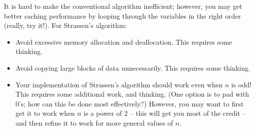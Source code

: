 \documentclass[11pt]{article}
\begin{document}

It is hard to make the conventional algorithm inefficient; however,
you may get better caching performance by looping through the
variables in the right order (really, try it!).  For Strassen's algorithm:
\begin{itemize}
\item Avoid excessive memory allocation and deallocation.  This requires
some thinking.
\item Avoid copying large blocks of data unnecessarily.   This requires
some thinking.
\item Your implementation of Strassen's algorithm should
work even when $n$ is odd!  This requires some additional work, and thinking.
(One option is to pad with 0's;  how can this be done most effectively?)
However, you may want to first get it to work when $n$ is a power of 2 --
this will get you most of the credit -- and then refine it to work for
more general values of $n$.  
\end{itemize}
\end{document}
